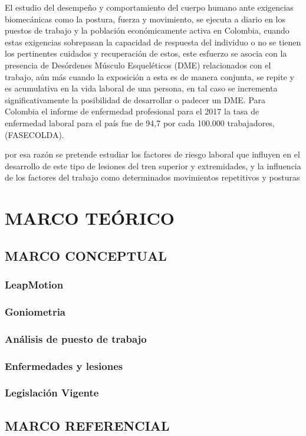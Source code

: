 El estudio del desempeño y comportamiento del cuerpo humano ante exigencias biomecánicas como la postura, fuerza y movimiento, se ejecuta a diario en los puestos de trabajo y la población económicamente activa en Colombia, cuando estas exigencias sobrepasan la capacidad de respuesta del individuo o no se tienen los pertinentes cuidados y recuperación de estos, este esfuerzo se asocia con la presencia de Desórdenes Músculo Esqueléticos (DME) relacionados con el trabajo, aún más cuando la exposición a esta es de manera conjunta, se repite y es acumulativa en la vida laboral de una persona, en tal caso se incrementa significativamente la posibilidad de desarrollar o padecer un DME. 
Para Colombia el informe de enfermedad profesional para el 2017 la tasa de enfermedad laboral para el país fue de 94,7 por cada 100.000 trabajadores, (FASECOLDA).

por esa razón se pretende estudiar los factores de riesgo laboral que influyen en el desarrollo de este tipo de lesiones del tren superior y extremidades, y la influencia de los factores del trabajo como determinados movimientos repetitivos y posturas

\chapter{MARCO TEÓRICO}
\section{MARCO CONCEPTUAL}
\subsection{LeapMotion}
\subsection{Goniometria}
\subsection{Análisis de puesto de trabajo}
\subsection{Enfermedades y lesiones}
\subsection{Legislación Vigente}
\section{MARCO REFERENCIAL}
